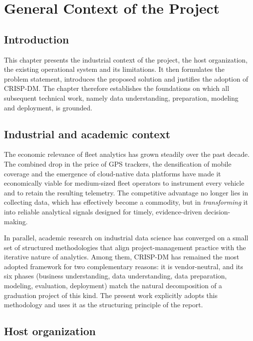 \chapter{General Context of the Project}
\label{chap:context}

\section{Introduction}
This chapter presents the industrial context of the project, the host organization, the existing operational system and its limitations. It then formulates the problem statement, introduces the proposed solution and justifies the adoption of CRISP-DM. The chapter therefore establishes the foundations on which all subsequent technical work, namely data understanding, preparation, modeling and deployment, is grounded.

\section{Industrial and academic context}
The economic relevance of fleet analytics has grown steadily over the past decade. The combined drop in the price of GPS trackers, the densification of mobile coverage and the emergence of cloud-native data platforms have made it economically viable for medium-sized fleet operators to instrument every vehicle and to retain the resulting telemetry. The competitive advantage no longer lies in collecting data, which has effectively become a commodity, but in \emph{transforming} it into reliable analytical signals designed for timely, evidence-driven decision-making.

In parallel, academic research on industrial data science has converged on a small set of structured methodologies that align project-management practice with the iterative nature of analytics. Among them, CRISP-DM has remained the most adopted framework for two complementary reasons: it is vendor-neutral, and its six phases (business understanding, data understanding, data preparation, modeling, evaluation, deployment) match the natural decomposition of a graduation project of this kind. The present work explicitly adopts this methodology and uses it as the structuring principle of the report.

\section{Host organization}

